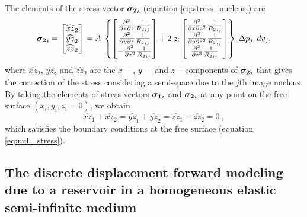\documentclass[journal abbreviation, manuscript]{copernicus}
\begin{document}
The elements  of the stress vector $\mbox{\boldmath$\sigma_{2}$}_{i}$ (equation \ref{eq:stress_nucleus}) are
\begin{equation}
\mbox{\boldmath$\sigma_{2}$}_{i}  = 
\begin{bmatrix} 
{\widehat{xz}_{2}} \\
{\widehat{yz}_{2}}  \\
{\widehat{zz}_{2}} 
\end{bmatrix}
= A  \: 
\left\{
\begin{bmatrix} 
\frac{\partial^{2}  }{\partial x \partial z} {\frac{1}{{R_2}_{ij}}} \\
\frac{\partial^{2} }{\partial y \partial z} {\frac{1}{{R_2}_{ij}}} \\
- \frac{\partial^{2} }{\partial z^{2}} {\frac{1}{{R_2}_{ij}}}   
\end{bmatrix}
+ 2 \: z_{i}
\begin{bmatrix} 
\frac{\partial^{3}  }{\partial x \partial z^{2}} {\frac{1}{{R_2}_{ij}}} \\
\frac{\partial^{3} }{\partial y \partial z^{2}} {\frac{1}{{R_2}_{ij}}} \\
\frac{\partial^{3} }{\partial z^{3}} {\frac{1}{{R_2}_{ij}}} 
\end{bmatrix}
\right\}
\: \Delta p_{j} \: \:dv_j,
\label{eq:nucleus-stress2-vector}
\end{equation}
where ${\widehat{xz}_{2}}$, ${\widehat{yz}_{2}}$ and ${\widehat{zz}_{2}}$ are the $x-$, $y-$  and $z-$components
of  $\mbox{\boldmath$\sigma_{2}$}_{i}$ that gives the correction of the stress considering  a semi-space due to the $j$th image nucleus.
By taking the elements of stress vectors $\mbox{\boldmath$\sigma_{1}$}_{i}$ and 
$\mbox{\boldmath$\sigma_{2}$}_{i}$ at any point on the free surface $(x_i, y_i, z_i = 0)$, we obtain
\begin{equation}
{\widehat{xz}_{1}} + {\widehat{xz}_{2}} 
= {\widehat{yz}_{1}} + {\widehat{yz}_{2}}
= {\widehat{zz}_{1}} + {\widehat{zz}_{2}}  
= 0 \: ,
\label{eq:null_stress_i}
\end{equation}
which satisfies the boundary conditions at the free surface 
(equation \ref{eq:null_stress}).


\subsection{The discrete displacement forward modeling due to a reservoir in a homogeneous elastic semi-infinite medium} \label{u-model}
\end{document}
